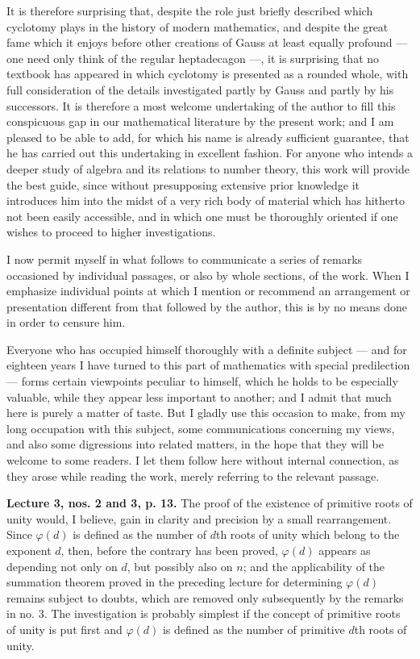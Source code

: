 \documentclass[11pt]{article}
\newcommand{\origpage}[1]{\par\vspace{0.25em}\noindent{\footnotesize\itshape [Printed page #1]}\par\vspace{0.25em}}
\begin{document}
It is therefore surprising that, despite the role just briefly described which cyclotomy plays in the history of modern mathematics, and despite the great fame which it enjoys before other creations of Gauss at least equally profound --- one need only think of the regular heptadecagon ---, it is surprising that no textbook has appeared in which cyclotomy is presented as a rounded whole, with full consideration of the details investigated partly by Gauss and partly by his successors. It is therefore a most welcome undertaking of the author to fill this conspicuous gap in our mathematical literature by the present work; and I am pleased to be able to add, for which his name is already sufficient guarantee, that he has carried out this undertaking in excellent fashion. For anyone who intends a deeper study of algebra and its relations to number theory, this work will provide the best guide, since without presupposing extensive prior knowledge it introduces him into the midst of a very rich body of material which has hitherto not been easily accessible, and in which one must be thoroughly oriented if one wishes to proceed to higher investigations.

I now permit myself in what follows to communicate a series of remarks occasioned by individual passages, or also by whole sections, of the work. When I emphasize individual points at which I mention or recommend an arrangement or presentation different from that followed by the author, this is by no means done in order to censure him.

\origpage{411}
Everyone who has occupied himself thoroughly with a definite subject --- and for eighteen years I have turned to this part of mathematics with special predilection --- forms certain viewpoints peculiar to himself, which he holds to be especially valuable, while they appear less important to another; and I admit that much here is purely a matter of taste. But I gladly use this occasion to make, from my long occupation with this subject, some communications concerning my views, and also some digressions into related matters, in the hope that they will be welcome to some readers. I let them follow here without internal connection, as they arose while reading the work, merely referring to the relevant passage.

\textbf{Lecture 3, nos. 2 and 3, p. 13.} The proof of the existence of primitive roots of unity would, I believe, gain in clarity and precision by a small rearrangement. Since $\varphi(d)$ is defined as the number of $d$th roots of unity which belong to the exponent $d$, then, before the contrary has been proved, $\varphi(d)$ appears as depending not only on $d$, but possibly also on $n$; and the applicability of the summation theorem proved in the preceding lecture for determining $\varphi(d)$ remains subject to doubts, which are removed only subsequently by the remarks in no. 3. The investigation is probably simplest if the concept of primitive roots of unity is put first and $\varphi(d)$ is defined as the number of primitive $d$th roots of unity.
\end{document}
